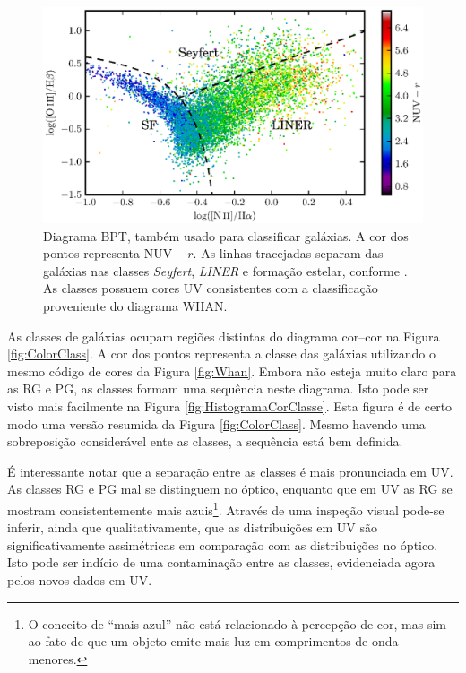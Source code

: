 \begin{figure}
	\includegraphics{figuras/bpt-uv.eps}
	\caption[Cores UV no diagrama BPT.]
	{Diagrama BPT, também usado para classificar galáxias. A cor dos
	pontos representa $\mathrm{NUV}-r$. As linhas tracejadas separam das galáxias nas
	classes {\em Seyfert}, {\em LINER} e formação estelar, conforme
	\citet[linhas S06 e K06 da tabela 1]{CidFernandes2010}. As classes possuem
	cores UV consistentes com a classificação proveniente do diagrama WHAN.}
	\label{fig:BPTUV}
\end{figure}

As classes de galáxias ocupam regiões distintas do diagrama cor--cor na Figura
\ref{fig:ColorClass}. A cor dos pontos representa a classe das galáxias
utilizando o mesmo código de cores da Figura \ref{fig:Whan}. Embora não esteja
muito claro para as RG e PG, as classes formam uma sequência neste diagrama.
Isto pode ser visto mais facilmente na Figura \ref{fig:HistogramaCorClasse}.
Esta figura é de certo modo uma versão resumida da Figura \ref{fig:ColorClass}.
Mesmo havendo uma sobreposição considerável ente as classes, a sequência está
bem definida.

É interessante notar que a separação entre as classes é mais pronunciada em UV.
As classes RG e PG mal se distinguem no óptico, enquanto que em UV as RG se
mostram consistentemente mais azuis\footnote{O conceito de ``mais azul'' não
está relacionado à percepção de cor, mas sim ao fato de que um objeto emite mais
luz em comprimentos de onda menores.}. Através de uma inspeção visual pode-se
inferir, ainda que qualitativamente, que as distribuições em UV são
significativamente assimétricas em comparação com as distribuições no óptico.
Isto pode ser indício de uma contaminação entre as classes, evidenciada agora
pelos novos dados em UV.


